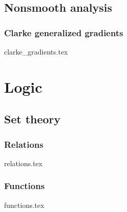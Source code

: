 \documentclass[numbers=endperiod, bibliography=totocnumbered]{scrartcl}
\begin{document}
\subsection{Nonsmooth analysis}\label{sec:nonsmooth_analysis}
\subsubsection{Clarke generalized gradients}\label{sec:clarke_gradients}
{clarke_gradients.tex}

\section{Logic}\label{sec:logic}
\subsection{Set theory}\label{sec:sets}
\subsubsection{Relations}\label{sec:sets/relations}
{relations.tex}
\subsubsection{Functions}\label{sec:sets/functions}
{functions.tex}

\printbibliography
\end{document}

